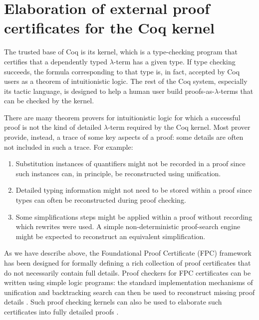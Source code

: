 \newpage
\section{Elaboration of external proof certificates for the Coq
  kernel}


The trusted base of Coq is its kernel, which is a type-checking
program that certifies that a dependently typed $\lambda$-term has a
given type.  If type checking succeeds, the formula corresponding to
that type is, in fact, accepted by Coq users as a theorem of
intuitionistic logic.  The rest of the Coq system, especially its
tactic language, is designed to help a human user build
proofs-as-$\lambda$-terms that can be checked by the kernel.

There are many theorem provers for intuitionistic logic for which a
successful proof is not the kind of detailed $\lambda$-term required
by the Coq kernel.  Most prover provide, instead, a trace of some key
aspects of a proof: some details are often not included in such a
trace.  For example:
\begin{enumerate}

\item Substitution instances of quantifiers might not be recorded in a
  proof since such instances can, in principle, be reconstructed using
  unification.

\item Detailed typing information might not need to be stored within a
  proof since types can often be reconstructed during proof checking.

\item Some simplifications steps might be applied within a proof
  without recording which rewrites were used.  A simple 
  non-deterministic proof-search engine might be expected to
  reconstruct an equivalent simplification.
\end{enumerate}

As we have describe above, the Foundational Proof Certificate (FPC)
framework has been designed for formally defining a rich collection of
proof certificates that do not necessarily contain full details.
Proof checkers for FPC certificates can be written using simple logic
programs: the standard implementation mechanisms of unification and
backtracking search can then be used to reconstruct missing proof
details \cite{miller17fac}.  Such proof checking kernels can also be
used to elaborate such certificates into fully detailed proofs
\cite{blanco17phd,blanco17cade}.

